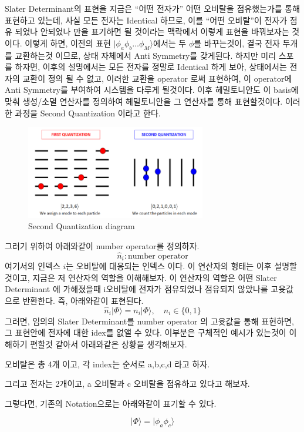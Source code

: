\documentclass[10pt]{article}
\begin{document}
Slater Determinant의 표현을 지금은 \enquote{어떤 전자가} 어떤 오비탈을 점유했는가를 통해 표현하고 있는데, 
사실 모든 전자는 Identical 하므로, 이를 \enquote{어떤 오비탈}이 전자가 점유 되었나 안되었나 만을 표기하면 될 것이라는 맥락에서 이렇게 표현을 바꿔보자는 것이다. 
이렇게 하면, 이전의 표현 \(\vert \phi_a \phi_b \dots \phi_M\rangle\)에서는 두 \(\phi\)를 바꾸는것이, 결국 전자 두개를 교환하는것 이므로, 상태 자체에서 Anti Symmetry를 갖게된다. 
하지만 미리 스포를 하자면, 이후의 설명에서는 모든 전자를 정말로 Identical 하게 보아, 상태에서는 전자의 교환이 정의 될 수 없고, 이러한 교환을 operator 로써 표현하여, 이 operator에 Anti Symmetry를 부여하여 시스템을 다루게 될것이다. 
이후 헤밀토니안도 이 basis에 맞춰 생성/소멸 연산자를 정의하여 헤밀토니안을 그 연산자를 통해 표현할것이다. 
이러한 과정을 Second Quantization 이라고 한다. 
\begin{figure}[H]
  \centering
  \includegraphics[width=0.7\textwidth]{fig/1to2.png}
  \caption{Second Quantization diagram}
  \label{fig:example2}
\end{figure}
그러기 위하여 아래와같이 number operator를 정의하자.
\[
\hat{n}_i : \text{number operator}
\]
여기서의 인덱스 \(i\)는 오비탈에 대응되는 인덱스 이다. 이 연산자의 형태는 이후 설명할것이고, 지금은 저 연산자의 역할을 이해해보자. 
이 연산자의 역할은 어떤 Slater Determinant 에 가해졌을때 i오비탈에 전자가 점유되었나 점유되지 않았나를 고윳값으로 반환한다. 즉, 아래와같이 표현된다. 
\[
\hat{n}_i | \Phi \rangle = n_i | \Phi \rangle, \quad n_i \in \{0,1\}
\]
그러면, 임의의 Slater Determinant를 number operator 의 고윳값을 통해 표현하면, 그 표현안에 전자에 대한 idex를 없앨 수 있다.
이부분은 구체적인 예시가 있는것이 이해하기 편할것 같아서 아래와같은 상황을 생각해보자. 

오비탈은 총 4개 이고, 각 index는 순서로 a,b,c,d 라고 하자. 

그리고 전자는 2개이고, a 오비탈과 c 오비탈을 점유하고 있다고 해보자. 

그렇다면, 기존의 Notation으로는 아래와같이 표기할 수 있다. 

\[| \Phi \rangle  = \vert \phi_a \phi_c \rangle\]
\end{document}
